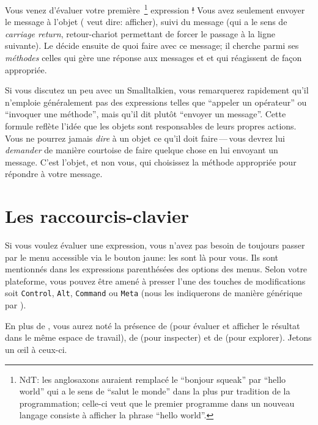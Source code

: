 \documentclass[a4paper,10pt,twoside]{book}
\begin{document}
Vous venez d'\'evaluer votre premi\`ere~\footnote{NdT: les anglosaxons
auraient remplac\'e le ``bonjour squeak'' par ``hello world'' qui a le
sens de ``salut le monde'' dans la plus pur tradition de la
programmation; celle-ci veut que le premier programme
dans un nouveau langage consiste \`a afficher la phrase ``hello
world''.}
expression \st!
Vous avez seulement envoyer le message  \`a
l'objet  ( veut dire: afficher), suivi du
message  
(qui a le sens de \emph{carriage return}, \cad retour-chariot
permettant de forcer le passage \`a la ligne suivante).
Le  d\'ecide ensuite de quoi faire avec ce message; il
cherche parmi ses \emph{m\'ethodes} celles qui g\`ere une r\'eponse
aux messages  et  et qui r\'eagissent de fa\c{c}on
appropri\'ee.

Si vous discutez un peu avec un Smalltalkien, vous remarquerez
rapidement qu'il n'emploie g\'en\'eralement pas des expressions
telles que ``appeler un op\'erateur'' ou ``invoquer une m\'ethode'',
mais qu'il dit plut\^ot ``envoyer un message''.
Cette formule refl\`ete l'id\'ee que les objets sont responsables de
leurs propres actions. Vous ne pourrez jamais \emph{dire} \`a un objet
ce qu'il doit faire\,---\,vous devrez lui \emph{demander} de mani\`ere
courtoise de faire quelque chose en lui envoyant un message.
C'est l'objet, et non vous, qui choisissez la m\'ethode appropri\'ee
pour r\'epondre \`a votre message.

\section{Les raccourcis-clavier}

Si vous voulez \'evaluer une expression, vous n'avez pas besoin de
toujours passer par le menu accessible via le bouton jaune: les
 sont l\`a pour vous. Ils sont mentionn\'es
dans les expressions parenth\'es\'ees des options des menus. Selon
votre plateforme, vous pouvez \^etre amen\'e \`a presser l'une des
touches de modifications soit \texttt{Control}, \texttt{Alt},
\texttt{Command} ou \texttt{Meta} (nous les indiquerons de mani\`ere
g\'en\'erique par ).


En plus de , vous aurez not\'e la pr\'esence de
(pour \'evaluer et afficher le r\'esultat dans le m\^eme espace de travail), 
de  (pour inspecter) et de  (pour
explorer). 
Jetons un \oe il \`a ceux-ci.
\end{document}
